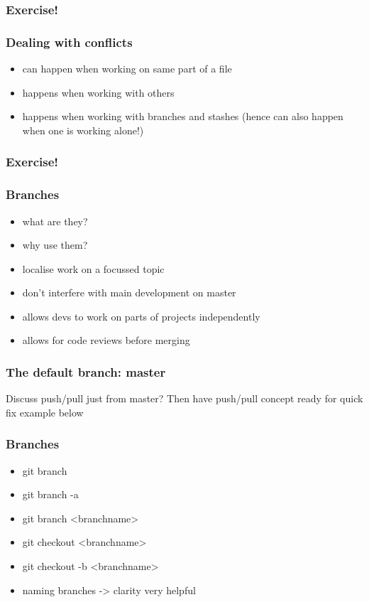 \documentclass{git_course}
\begin{document}
\begin{frame}
\frametitle{Exercise!}
\end{frame}

\begin{frame}
\frametitle{Dealing with conflicts}
\begin{itemize}
    \item can happen when working on same part of a file
    \item happens when working with others
    \item happens when working with branches and stashes (hence can also
        happen when one is working alone!)
\end{itemize}
\end{frame}

\begin{frame}
\frametitle{Exercise!}
\end{frame}

\begin{frame}
\frametitle{Branches}
\begin{itemize}
    \item what are they?
    \item why use them?
    \item localise work on a focussed topic
    \item don't interfere with main development on master
    \item allows devs to work on parts of projects independently
    \item allows for code reviews before merging
\end{itemize}
\end{frame}

\begin{frame}
\frametitle{The default branch: master}

Discuss push/pull just from master?  Then have push/pull concept ready
for quick fix example below
\end{frame}

\begin{frame}
\frametitle{Branches}
\begin{itemize}
    \item git branch
    \item git branch -a
    \item git branch <branchname>
    \item git checkout <branchname>
    \item git checkout -b <branchname>
    \item naming branches -> clarity very helpful
\end{itemize}
\end{frame}
\end{document}

